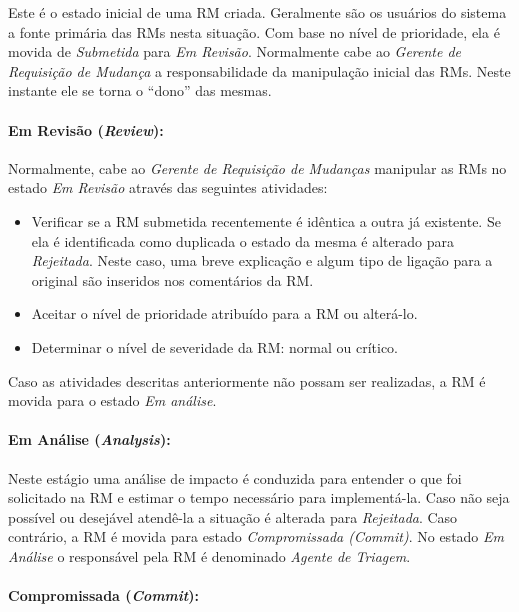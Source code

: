 Este é o estado inicial de uma RM criada. Geralmente são os usuários do sistema
a fonte primária das RMs nesta situação. Com base no nível de prioridade, ela é
movida de \textit{Submetida} para \textit{Em Revisão}. Normalmente cabe ao
\textit{Gerente de Requisição de Mudança} a responsabilidade da manipulação
inicial das RMs. Neste instante ele se torna o ``dono'' das mesmas.

\paragraph{Em Revisão (\textit{Review}):}\label{par:em_revisao}
Normalmente, cabe ao \textit{Gerente de Requisição de Mudanças} manipular as
RMs no estado \textit{Em Revisão} através das seguintes atividades:

\begin{itemize}
    \item Verificar se a RM submetida recentemente é idêntica a outra já
        existente. Se ela é identificada como duplicada o estado da mesma é
        alterado para \textit{Rejeitada}. Neste caso, uma breve explicação e
        algum tipo de ligação para a original são inseridos nos comentários da
        RM\@.
	\item Aceitar o nível de prioridade atribuído para a RM ou alterá-lo.
	\item Determinar o nível de severidade da RM\@: normal ou crítico.
\end{itemize}

Caso as atividades descritas anteriormente não possam ser re\-a\-li\-za\-das, a
RM é movida para o estado \textit{Em análise}.

\paragraph{Em Análise (\textit{Analysis}):}\label{par:em_analise}

Neste estágio uma análise de impacto é conduzida para entender o que foi
solicitado na RM e estimar o tempo necessário para implementá-la. Caso não seja
possível ou desejável atendê-la a situação é alterada para \textit{Rejeitada}.
Caso contrário, a RM é movida para estado \textit{Compromissada (Commit)}. No
estado \textit{Em Análise} o responsável pela RM é denominado \textit{Agente de
    Triagem}.

\paragraph{Compromissada (\textit{Commit}):}\label{par:commit}

